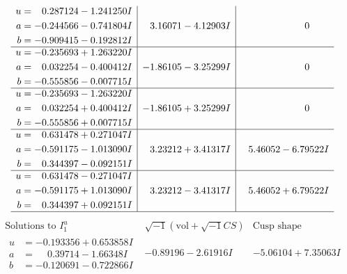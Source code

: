\documentclass[1p]{elsarticle_modified}
\theoremstyle{definition}
\newcommand{\I}{\sqrt{-1}}
\begin{document}
$$\begin{array}{c|c|c}
\begin{aligned}
u &= \phantom{-}0.287124 - 1.241250 I \\
a &= -0.244566 - 0.741804 I \\
b &= -0.909415 - 0.192812 I\end{aligned}
 & \phantom{-}3.16071 - 4.12903 I & \phantom{-0.000000 } 0 \\ \hline\begin{aligned}
u &= -0.235693 + 1.263220 I \\
a &= \phantom{-}0.032254 - 0.400412 I \\
b &= -0.555856 - 0.007715 I\end{aligned}
 & -1.86105 - 3.25299 I & \phantom{-0.000000 } 0 \\ \hline\begin{aligned}
u &= -0.235693 - 1.263220 I \\
a &= \phantom{-}0.032254 + 0.400412 I \\
b &= -0.555856 + 0.007715 I\end{aligned}
 & -1.86105 + 3.25299 I & \phantom{-0.000000 } 0 \\ \hline\begin{aligned}
u &= \phantom{-}0.631478 + 0.271047 I \\
a &= -0.591175 - 1.013090 I \\
b &= \phantom{-}0.344397 - 0.092151 I\end{aligned}
 & \phantom{-}3.23212 + 3.41317 I & \phantom{-}5.46052 - 6.79522 I \\ \hline\begin{aligned}
u &= \phantom{-}0.631478 - 0.271047 I \\
a &= -0.591175 + 1.013090 I \\
b &= \phantom{-}0.344397 + 0.092151 I\end{aligned}
 & \phantom{-}3.23212 - 3.41317 I & \phantom{-}5.46052 + 6.79522 I\\
 \hline 
 \end{array}$$\newpage$$\begin{array}{c|c|c}  
\text{Solutions to }I^u_{1}& \I (\text{vol} + \sqrt{-1}CS) & \text{Cusp shape}\\
 \hline 
\begin{aligned}
u &= -0.193356 + 0.653858 I \\
a &= \phantom{-}0.39714 - 1.66348 I \\
b &= -0.120691 - 0.722866 I\end{aligned}
 & -0.89196 - 2.61916 I & -5.06104 + 7.35063 I \\ \hline\begin{aligned}

\end{aligned}
\end{array}$$
\end{document}
